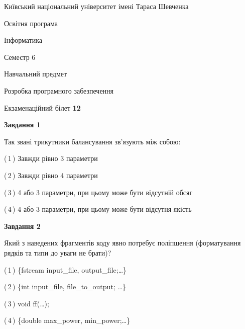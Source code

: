 \documentclass[10pt, ukrainian]{article}
\begin{document}
{{\begin {small}\par
{ \center  Київський національний університет імені Тараса Шевченка \par}
{\parbox {5 cm}{Освітня програма \hfill}{\parbox {7 cm}{Інформатика \hfill}}\parbox {6 cm}{\hfill Семестр 6}}\par
{\parbox {5 cm} {Навчальний предмет \hfill}\parbox {7 cm}{Розробка програмного забезпечення \hfill}\parbox {6cm}{\hfill}\par}\vspace{-7pt} \end{small}}{\center Екзаменаційний білет \No \textbf
{ 12 }\par}}
{
\begin {large}
{\begin {center}\textbf{Завдання 1}\end {center}}\par
Так звані трикутники балансування зв'язують між собою:\par
\vspace{2mm}



(\,1\,) Завжди рівно 3 параметри%



(\,2\,) Завжди рівно 4 параметри%



(\,3\,) 4 або 3 параметри, при цьому може бути відсутній обсяг %



(\,4\,) 4 або 3 параметри, при цьому може бути відсутня якість%


{\begin {center}\textbf{Завдання 2}\end {center}}\par
Який з наведених фрагментів коду явно потребує поліпшення (форматування рядків та типи до уваги не брати)?\par
\vspace{2mm}



(\,1\,) \{fstream input\_file, output\_file;…\} %



(\,2\,) \{int input\_file, file\_to\_output; …\}%



(\,3\,) void ff(…);%



(\,4\,) \{double max\_power, min\_power;…\} %



\end{large}}
\end{document}

